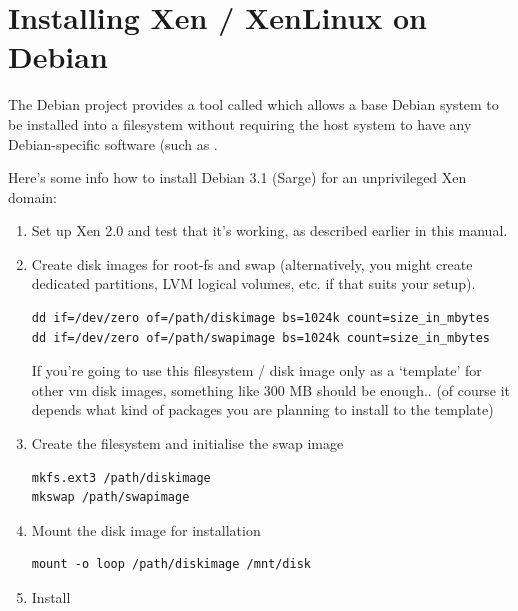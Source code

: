 \documentclass[11pt,twoside,final,openright]{report}
\begin{document}
{\appendix


\chapter{Installing Xen / XenLinux on Debian}

The Debian project provides a tool called  which
allows a base Debian system to be installed into a filesystem without
requiring the host system to have any Debian-specific software (such
as . 

Here's some info how to install Debian 3.1 (Sarge) for an unprivileged
Xen domain:

\begin{enumerate}
\item Set up Xen 2.0 and test that it's working, as described earlier in
      this manual.

\item Create disk images for root-fs and swap (alternatively, you
      might create dedicated partitions, LVM logical volumes, etc. if
      that suits your setup).
\begin{small}\begin{verbatim}  
dd if=/dev/zero of=/path/diskimage bs=1024k count=size_in_mbytes
dd if=/dev/zero of=/path/swapimage bs=1024k count=size_in_mbytes
\end{verbatim}\end{small}
      If you're going to use this filesystem / disk image only as a
      `template' for other vm disk images, something like 300 MB should
      be enough.. (of course it depends what kind of packages you are
      planning to install to the template)

\item Create the filesystem and initialise the swap image
\begin{small}\begin{verbatim}
mkfs.ext3 /path/diskimage
mkswap /path/swapimage
\end{verbatim}\end{small}

\item Mount the disk image for installation
\begin{small}\begin{verbatim}
mount -o loop /path/diskimage /mnt/disk
\end{verbatim}\end{small}

\item Install 


\end{enumerate}}
\end{document}
